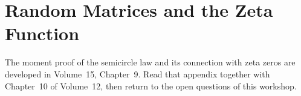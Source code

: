 \chapter{Random Matrices and the Zeta Function}
The moment proof of the semicircle law and its connection with zeta zeros are developed in Volume~15, Chapter~9. Read that appendix together with Chapter~10 of Volume~12, then return to the open questions of this workshop.

